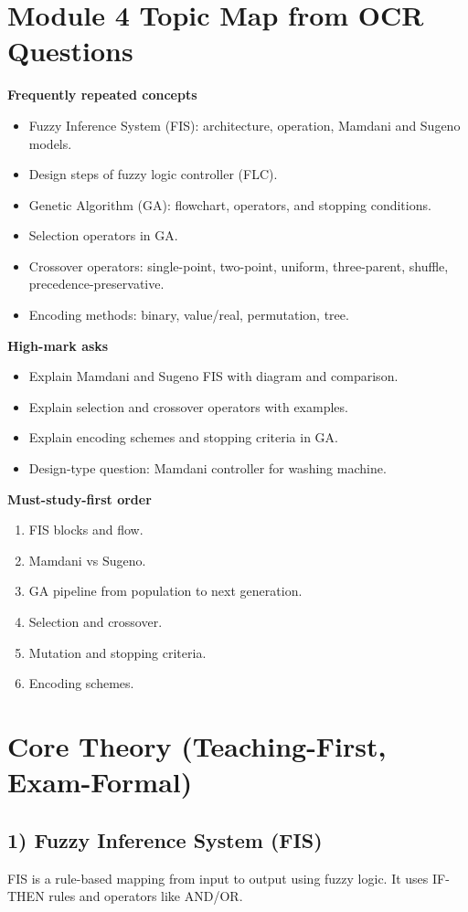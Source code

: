 \documentclass[11pt,a4paper]{article}
\begin{document}
\section*{Module 4 Topic Map from OCR Questions}
\textbf{Frequently repeated concepts}
\begin{itemize}
\item Fuzzy Inference System (FIS): architecture, operation, Mamdani and Sugeno models.
\item Design steps of fuzzy logic controller (FLC).
\item Genetic Algorithm (GA): flowchart, operators, and stopping conditions.
\item Selection operators in GA.
\item Crossover operators: single-point, two-point, uniform, three-parent, shuffle, precedence-preservative.
\item Encoding methods: binary, value/real, permutation, tree.
\end{itemize}

\textbf{High-mark asks}
\begin{itemize}
\item Explain Mamdani and Sugeno FIS with diagram and comparison.
\item Explain selection and crossover operators with examples.
\item Explain encoding schemes and stopping criteria in GA.
\item Design-type question: Mamdani controller for washing machine.
\end{itemize}

\textbf{Must-study-first order}
\begin{enumerate}
\item FIS blocks and flow.
\item Mamdani vs Sugeno.
\item GA pipeline from population to next generation.
\item Selection and crossover.
\item Mutation and stopping criteria.
\item Encoding schemes.
\end{enumerate}

\section*{Core Theory (Teaching-First, Exam-Formal)}

\subsection*{1) Fuzzy Inference System (FIS)}
FIS is a rule-based mapping from input to output using fuzzy logic. It uses IF-THEN rules and operators like AND/OR.
\end{document}
